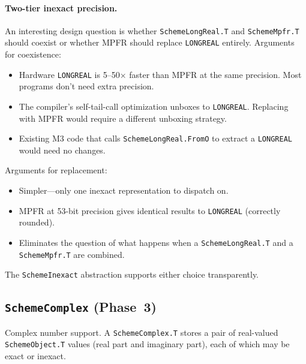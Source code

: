 \documentclass[12pt]{article}
\begin{document}
\paragraph{Two-tier inexact precision.}
An interesting design question is whether {\tt SchemeLongReal.T}
and {\tt SchemeMpfr.T} should coexist or whether MPFR should
replace {\tt LONGREAL} entirely.  Arguments for coexistence:
\begin{itemize}[nosep]
\item Hardware {\tt LONGREAL} is 5--50$\times$ faster than MPFR
  at the same precision.  Most programs don't need extra precision.
\item The compiler's self-tail-call optimization unboxes to
  {\tt LONGREAL}.  Replacing with MPFR would require a different
  unboxing strategy.
\item Existing M3 code that calls {\tt SchemeLongReal.FromO} to
  extract a {\tt LONGREAL} would need no changes.
\end{itemize}
Arguments for replacement:
\begin{itemize}[nosep]
\item Simpler---only one inexact representation to dispatch on.
\item MPFR at 53-bit precision gives identical results to
  {\tt LONGREAL} (correctly rounded).
\item Eliminates the question of what happens when a
  {\tt SchemeLongReal.T} and a {\tt SchemeMpfr.T} are combined.
\end{itemize}
The {\tt SchemeInexact} abstraction supports either choice
transparently.

\subsection{{\tt SchemeComplex} (Phase~3)}
\label{sec:iface-complex}

Complex number support.  A {\tt SchemeComplex.T} stores a pair
of real-valued {\tt SchemeObject.T} values (real part and
imaginary part), each of which may be exact or inexact.
\end{document}
